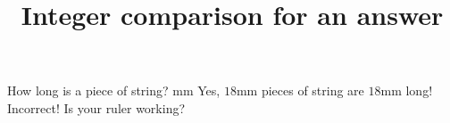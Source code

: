 \documentclass[hidesidemenu]{webquiz}
\title{Integer comparison for an answer}
\begin{document}
  \begin{question}     %
     How long is a piece of string?
      mm
     \whenRight Yes, $18$mm pieces of string are $18$mm long!
     \whenWrong Incorrect! Is your ruler working?
  \end{question}
\end{document}
